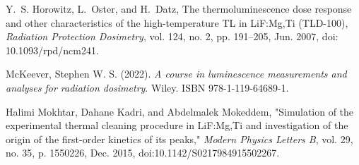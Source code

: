 
\begin{thebibliography}{999}

 Y.~S. Horowitz, L.~Oster, and H.~Datz, The thermoluminescence dose response and other characteristics of the high-temperature TL in LiF:Mg,Ti (TLD-100), \textit{Radiation Protection Dosimetry}, vol. 124, no. 2, pp. 191--205, Jun. 2007, doi: 10.1093/rpd/ncm241.

McKeever, Stephen W. S. (2022). \textit{A course in luminescence measurements and analyses for radiation dosimetry}. Wiley. ISBN 978-1-119-64689-1.

Halimi Mokhtar, Dahane Kadri, and Abdelmalek Mokeddem,
"Simulation of the experimental thermal cleaning procedure in LiF:Mg,Ti and investigation of the origin of the first-order kinetics of its peaks,"
\textit{Modern Physics Letters B}, vol. 29, no. 35, p. 1550226, Dec. 2015, doi:10.1142/S0217984915502267.

\end{thebibliography}